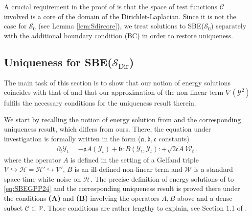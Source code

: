 \documentclass[a4paper, reqno, 12pt]{amsart}
\theoremstyle{plain}
\theoremstyle{definition}
\newcommand{\Sdir}{\mathcal{S}_{\text{Dir}}}
\begin{document}
A crucial requirement in the proof of \cite{GPP24} is that the space of test functions $\mathcal C$ involved is a core of the domain of the Dirichlet-Laplacian. Since it is not the case for $\mathcal S_0$ (see Lemma \ref{lem:Sdircore}), we treat solutions to SBE($\mathcal S_0$) separately with the additional boundary condition (BC) in order to restore uniqueness. 


\subsection{Uniqueness for SBE($\Sdir$)} 
\label{subsec:Sdir}
The main task of this section is to show that our notion of energy solutions coincides with that of \cite{GPP24} and that our approximation of the non-linear term $\nabla(\mathcal Y^2)$ fulfils the necessary conditions for the uniqueness result therein.

We start by recalling the notion of energy solution from \cite{GPP24} and the corresponding uniqueness result, which differs from ours. There, the equation under investigation is formally written in the form ($\mathfrak a, \mathfrak b, \mathfrak c$ constants)
\begin{align} 
\label{eq:SBEGPP24}
    \partial_t \mathcal{Y}_t = -\mathfrak aA(\mathcal{Y}_t) + \mathfrak b:\!B(\mathcal{Y}_t,\mathcal{Y}_t)\!: + \sqrt{2\mathfrak cA}\mathcal W_t \ .
\end{align}
where the operator $A$ is defined in the setting of a Gelfand triple \cite{LR15}  $\mathcal V \hookrightarrow \mathcal H=\mathcal H'\hookrightarrow \mathcal V'$, $B$ is an ill-defined non-linear term and $\mathcal W$ is a standard space-time white noise on $\mathcal H$. The precise definition of energy solutions of \cite{GPP24} to \eqref{eq:SBEGPP24} and the corresponding uniqueness result is proved there under the conditions \textbf{(A)} and \textbf{(B)} involving the operators $A, B$ above and a dense subset $\mathcal C \subset \mathcal V$. Those conditions are rather lengthy to explain, see Section 1.1 of \cite{GPP24}. 


\medskip
\end{document}

